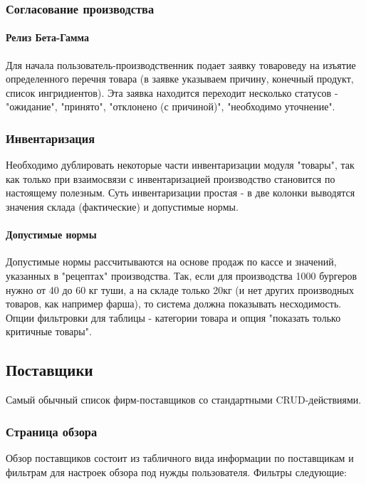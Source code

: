 \documentclass[DIV=calc, paper=a4, fontsize=11pt]{scrartcl} %
\begin{document}
\subsubsection{Согласование производства}

\paragraph{Релиз Бета-Гамма}
Для начала пользователь-производственник подает заявку товароведу на изъятие определенного перечня товара (в заявке указываем причину, конечный продукт, список ингридиентов). Эта заявка находится переходит несколько статусов - "ожидание", "принято", "отклонено (с причиной)", "необходимо уточнение".

\subsubsection{Инвентаризация}
Необходимо дублировать некоторые части инвентаризации модуля "товары", так как только при взаимосвязи с инвентаризацией производство становится по настоящему полезным. Суть инвентаризации простая - в две колонки выводятся значения склада (фактические) и допустимые нормы. 
\paragraph{Допустимые нормы}
Допустимые нормы рассчитываются на основе продаж по кассе и значений, указанных в "рецептах" производства. Так, если для производства 1000 бургеров нужно от 40 до 60 кг туши, а на складе только 20кг (и нет других производных товаров, как например фарша), то система должна показывать несходимость. 
\\[0.5cm]
Опции фильтровки для таблицы - категории товара и опция "показать только критичные товары".

\subsection{Поставщики}

Самый обычный список фирм-поставщиков со стандартными CRUD-действиями.

\subsubsection{Страница обзора}

Обзор поставщиков состоит из табличного вида информации по поставщикам и фильтрам для настроек обзора под нужды пользователя. Фильтры следующие:
\end{document}
